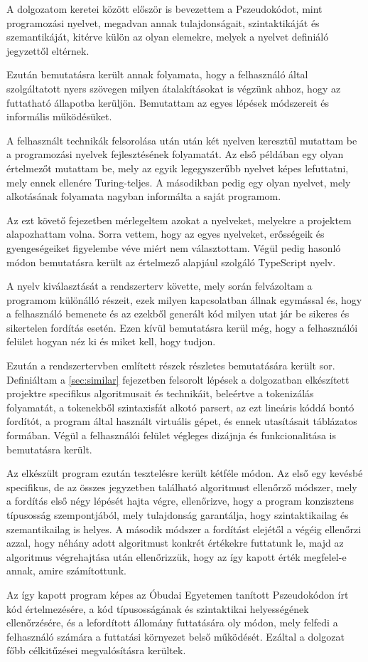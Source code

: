 A dolgozatom keretei között először is bevezettem a Pszeudokódot, mint programozási nyelvet, megadvan annak tulajdonságait, szintaktikáját és szemantikáját, kitérve külön az olyan elemekre, melyek a nyelvet definiáló jegyzettől eltérnek.

Ezután bemutatásra került annak folyamata, hogy a felhasználó által szolgáltatott nyers szövegen milyen átalakításokat is végzünk ahhoz, hogy az futtatható állapotba kerüljön. Bemutattam az egyes lépések módszereit és informális működésüket.

A felhasznált technikák felsorolása után után két nyelven keresztül mutattam be a programozási nyelvek fejlesztésének folyamatát. Az első példában egy olyan értelmezőt mutattam be, mely az egyik legegyszerűbb nyelvet képes lefuttatni, mely ennek ellenére Turing-teljes. A másodikban pedig egy olyan nyelvet, mely alkotásának folyamata nagyban informálta a saját programom.

Az ezt követő fejezetben mérlegeltem azokat a nyelveket, melyekre a projektem alapozhattam volna. Sorra vettem, hogy az egyes nyelveket, erősségeik és gyengeségeiket figyelembe véve miért nem választottam. Végül pedig hasonló módon bemutatásra került az értelmező alapjául szolgáló TypeScript nyelv.

A nyelv kiválasztását a rendszerterv követte, mely során felvázoltam a programom különálló részeit, ezek milyen kapcsolatban állnak egymással és, hogy a felhasználó bemenete és az ezekből generált kód milyen utat jár be sikeres és sikertelen fordítás esetén. Ezen kívül bemutatásra kerül még, hogy a felhasználói felület hogyan néz ki és miket kell, hogy tudjon.

Ezután a rendszertervben említett részek részletes bemutatására került sor. Definiáltam a \ref{sec:similar} fejezetben felsorolt lépések a dolgozatban elkészített projektre specifikus algoritmusait és technikáit, beleértve a tokenizálás folyamatát, a tokenekből szintaxisfát alkotó parsert, az ezt lineáris kóddá bontó fordítót, a program által használt virtuális gépet, és ennek utasításait táblázatos formában. Végül a felhasználói felület végleges dizájnja és funkcionalitása is bemutatásra került.

Az elkészült program ezután tesztelésre került kétféle módon. Az első egy kevésbé specifikus, de az összes jegyzetben található algoritmust ellenőrző módszer, mely a fordítás első négy lépését hajta végre, ellenőrizve, hogy a program konzisztens típusosság szempontjából, mely tulajdonság garantálja, hogy szintaktikailag és szemantikailag is helyes. A második módszer a fordítást elejétől a végéig ellenőrzi azzal, hogy néhány adott algoritmust konkrét értékekre futtatunk le, majd az algoritmus végrehajtása után ellenőrizzük, hogy az így kapott érték megfelel-e annak, amire számítottunk.

Az így kapott program képes az Óbudai Egyetemen tanított Pszeudokódon írt kód értelmezésére, a kód típusosságának és szintaktikai helyességének ellenőrzésére, és a lefordított állomány futtatására oly módon, mely felfedi a felhasználó számára a futtatási környezet belső működését. Ezáltal a dolgozat főbb célkitűzései megvalósításra kerültek.
